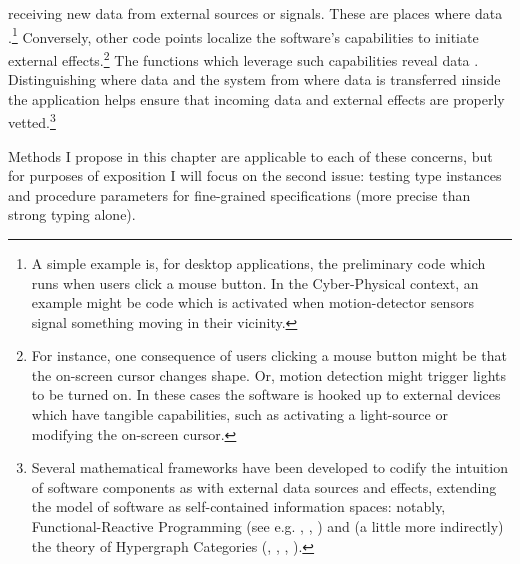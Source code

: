 {\begin{enumerate}
receiving new data from external sources or signals.  
These are places where data 
.\footnote{A simple example is, for desktop applications, 
the preliminary code which runs when users click a mouse button.  
In the Cyber-Physical context, an example might be code which
is activated when motion-detector sensors signal something moving 
in their vicinity.
}  Conversely, other code points localize 
the software's capabilities to initiate external effects.\footnote{For 
instance, one consequence of users clicking a mouse button might 
be that the on-screen cursor changes shape.  Or, motion detection 
might trigger lights to be turned on.  In these cases the software 
is hooked up to external devices which have tangible capabilities, 
such as activating a light-source or modifying the on-screen cursor.
}  The functions which leverage such capabilities 
reveal data .  
Distinguishing where data 
 and  the system from where data is transferred 
\i{inside} the application helps ensure that 
incoming data and external effects are properly vetted.\footnote{Several mathematical frameworks have been developed 
to codify the intuition of software components as 
 with external data sources and effects, 
extending the model of software as self-contained 
information spaces: notably, Functional-Reactive Programming 
(see e.g. \cite{WolfgangJeltsch}, \cite{JenniferPaykin},
\cite{PaykinKrishnaswami}) and (a little more indirectly)
the theory of Hypergraph Categories
(\cite{InteractingConceptualSpaces}, \cite{BrendanFong}, 
\cite{BrendanFongThesis}, \cite{AleksKissinger}). 
}
\end{enumerate}
Methods I propose in this chapter are applicable to each 
of these concerns, but for purposes of exposition I 
will focus on the second issue: testing 
type instances and procedure parameters for fine-grained 
specifications (more precise than strong typing alone). 
}
